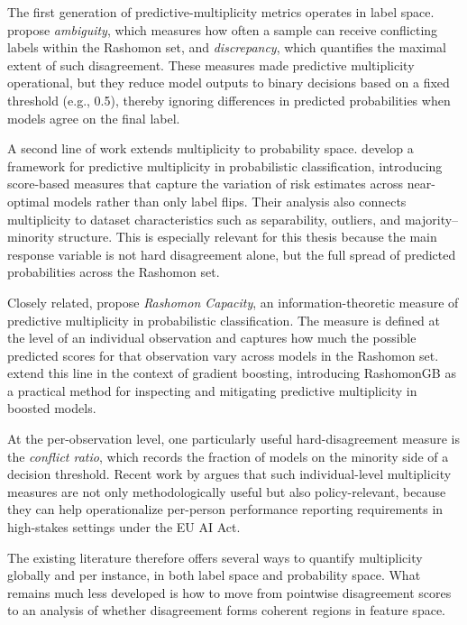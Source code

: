 The first generation of predictive-multiplicity metrics operates in label space.
\cite{marx_predictive_2020} propose \emph{ambiguity}, which measures how often a sample
can receive conflicting labels within the Rashomon set, and \emph{discrepancy}, which
quantifies the maximal extent of such disagreement. These measures made predictive multiplicity
operational, but they reduce model outputs to binary decisions based on a fixed threshold (e.g., 0.5), 
thereby ignoring differences in predicted probabilities when models agree on the final label.

A second line of work extends multiplicity to probability space.
\cite{watson-daniels_predictive_2023} develop a framework for predictive multiplicity in
probabilistic classification, introducing score-based measures that capture the variation
of risk estimates across near-optimal models rather than only label flips. Their analysis
also connects multiplicity to dataset characteristics such as separability, outliers, and
majority--minority structure. This is especially relevant for this thesis because the
main response variable is not hard disagreement alone, but the full spread of predicted
probabilities across the Rashomon set.

Closely related, \cite{hsu_rashomon_nodate} propose \emph{Rashomon Capacity}, an
information-theoretic measure of predictive multiplicity in probabilistic classification.
The measure is defined at the level of an individual observation and captures how much
the possible predicted scores for that observation vary across models in the Rashomon set.
\cite{hsu_rashomongb_2024} extend this line in the context of gradient boosting, introducing
RashomonGB as a practical method for inspecting and mitigating predictive multiplicity in boosted models.

At the per-observation level, one particularly useful hard-disagreement measure is the
\emph{conflict ratio}, which records the fraction of models on the minority side of a
decision threshold. Recent work by \cite{frohnapfel_using_2026} argues that such
individual-level multiplicity measures are not only methodologically useful but also
policy-relevant, because they can help operationalize per-person performance reporting
requirements in high-stakes settings under the EU AI Act.

The existing literature therefore offers several ways to quantify multiplicity globally
and per instance, in both label space and probability space. What remains much less
developed is how to move from pointwise disagreement scores to an analysis of whether
disagreement forms coherent regions in feature space.


